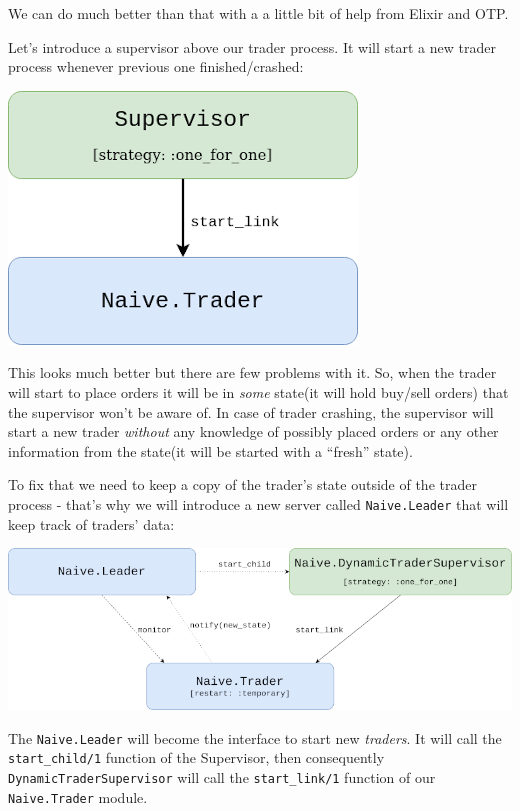 \documentclass[
  oneside]{book}
\begin{document}
We can do much better than that with a a little bit of help from Elixir and OTP.

Let's introduce a supervisor above our trader process. It will start a new trader process whenever previous one finished/crashed:

\includegraphics{images/chapter_05_02_supervise_the_trader.png}

This looks much better but there are few problems with it. So, when the trader will start to place orders it will be in \emph{some} state(it will hold buy/sell orders) that the supervisor won't be aware of. In case of trader crashing, the supervisor will start a new trader \emph{without} any knowledge of possibly placed orders or any other information from the state(it will be started with a ``fresh'' state).

To fix that we need to keep a copy of the trader's state outside of the trader process - that's why we will introduce a new server called \texttt{Naive.Leader} that will keep track of traders' data:

\includegraphics{images/chapter_05_03_leader_added.png}

The \texttt{Naive.Leader} will become the interface to start new \emph{traders}. It will call the \texttt{start\_child/1} function of the Supervisor, then consequently \texttt{DynamicTraderSupervisor} will call the \texttt{start\_link/1} function of our \texttt{Naive.Trader} module.
\end{document}
